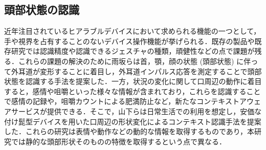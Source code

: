 \documentclass[Japanese,noauthor]{dicomopapers}
\begin{document}
\subsection{頭部状態の認識}
近年注目されているヒアラブルデバイスにおいて求められる機能の一つとして，手や視界を占有することのないデバイス操作機能が挙げられる．既存の製品や既存研究では認識精度や認識できるジェスチャの種類，頑健性などの点で課題が残る．これらの課題の解決のために雨坂ら\cite{ear}は首，顎，顔の状態 (頭部状態) に伴って外耳道が変形することに着目し，外耳道インパルス応答を測定することで頭部状態を認識する手法を提案した．一方，状況の変化に関して口周辺の動作に着目すると，感情や咀嚼といった様々な情報が含まれており，これらを認識することで感情の記録や，咀嚼カウントによる肥満防止など，新たなコンテキストアウェアサービスが提供できる．そこで，山下ら\cite{mouth}は日常生活での利用を想定し，安価な付け髭型デバイスを用いた口周辺の形状変化によるコンテキスト認識手法を提案した．これらの研究は表情や動作などの動的な情報を取得するものであり，本研究では静的な頭部形状そのものの特徴を取得するという点で異なる．
\end{document}
